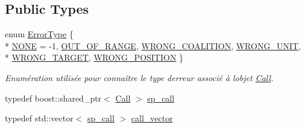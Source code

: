 \subsection*{Public Types}
\begin{DoxyCompactItemize}
\item 
enum \hyperlink{class_call_ade833a08ce215aaa4121102f3448c898}{Error\+Type} \{ \\*
\hyperlink{class_call_ade833a08ce215aaa4121102f3448c898a672dcb94435dc8e1e9a33ae581328ff4}{N\+O\+NE} = -\/1, 
\hyperlink{class_call_ade833a08ce215aaa4121102f3448c898a6683d72305e4eb207a1fef960d382da2}{O\+U\+T\+\_\+\+O\+F\+\_\+\+R\+A\+N\+GE}, 
\hyperlink{class_call_ade833a08ce215aaa4121102f3448c898afbdbbeb758c8827116fcd1b22da74d98}{W\+R\+O\+N\+G\+\_\+\+C\+O\+A\+L\+I\+T\+I\+ON}, 
\hyperlink{class_call_ade833a08ce215aaa4121102f3448c898a92cfb2a9e7bb655e5238e59cd2e77c95}{W\+R\+O\+N\+G\+\_\+\+U\+N\+IT}, 
\\*
\hyperlink{class_call_ade833a08ce215aaa4121102f3448c898a737864f300ae8be2eae56bcd4b71072d}{W\+R\+O\+N\+G\+\_\+\+T\+A\+R\+G\+ET}, 
\hyperlink{class_call_ade833a08ce215aaa4121102f3448c898ab5c4229f384c869c390469e0edc2c335}{W\+R\+O\+N\+G\+\_\+\+P\+O\+S\+I\+T\+I\+ON}
 \}\begin{DoxyCompactList}\small\item\em Enumération utilisée pour connaître le type d\textquotesingle{}erreur associé à l\textquotesingle{}objet \hyperlink{class_call}{Call}. \end{DoxyCompactList}
\item 
typedef boost\+::shared\+\_\+ptr$<$ \hyperlink{class_call}{Call} $>$ \hyperlink{class_call_a4c0609ade3e9bd1366499e2f64f6e0a2}{sp\+\_\+call}
\item 
typedef std\+::vector$<$ \hyperlink{class_call_a4c0609ade3e9bd1366499e2f64f6e0a2}{sp\+\_\+call} $>$ \hyperlink{class_call_aa446a4316c03fb722ab10d0e1da33643}{call\+\_\+vector}
\end{DoxyCompactItemize}
